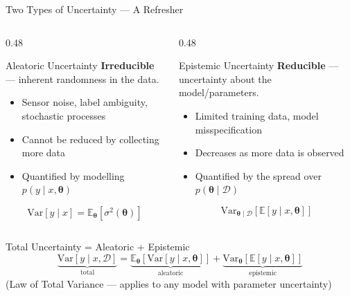 \documentclass[aspectratio=169]{beamer}
\newcommand{\E}{\mathbb{E}}
\newcommand{\Var}{\mathrm{Var}}
\newcommand{\calD}{\mathcal{D}}
\newcommand{\btheta}{\bm{\theta}}
\begin{document}
\begin{frame}{Two Types of Uncertainty — A Refresher}

  \begin{columns}[T]
    \begin{column}{0.48\textwidth}
      \begin{block}{Aleatoric Uncertainty}
        \textbf{Irreducible} — inherent randomness in the data.
        \begin{itemize}
          \item Sensor noise, label ambiguity, stochastic processes
          \item Cannot be reduced by collecting more data
          \item Quantified by modelling $p(y \mid x, \btheta)$
        \end{itemize}
        \[
          \Var[y \mid x] = \E_{\btheta}\!\left[\sigma^2(\btheta)\right]
        \]
      \end{block}
    \end{column}
    \begin{column}{0.48\textwidth}
      \begin{block}{Epistemic Uncertainty}
        \textbf{Reducible} — uncertainty about the model/parameters.
        \begin{itemize}
          \item Limited training data, model misspecification
          \item Decreases as more data is observed
          \item Quantified by the spread over $p(\btheta \mid \calD)$
        \end{itemize}
        \[
          \Var_{\btheta \mid \calD}\!\left[\E[y \mid x, \btheta]\right]
        \]
      \end{block}
    \end{column}
  \end{columns}

  \begin{alertblock}{Total Uncertainty = Aleatoric + Epistemic}
    \[
      \underbrace{\Var[y \mid x, \calD]}_{\text{total}}
      = \underbrace{\E_{\btheta}\!\left[\Var[y \mid x, \btheta]\right]}_{\text{aleatoric}}
      + \underbrace{\Var_{\btheta}\!\left[\E[y \mid x, \btheta]\right]}_{\text{epistemic}}
    \]
    (Law of Total Variance — applies to any model with parameter uncertainty)
  \end{alertblock}

\end{frame}
\end{document}
